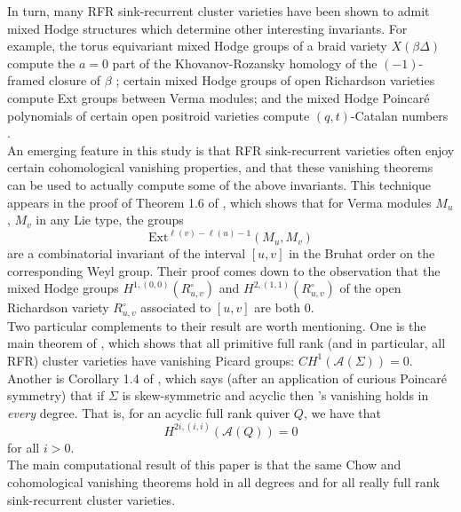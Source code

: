 \documentclass[11pt]{amsart}
\theoremstyle{definition}
\theoremstyle{remark}
\numberwithin{equation}{section}
\begin{document}
In turn, many RFR sink-recurrent cluster varieties have been shown to admit mixed Hodge structures which determine other interesting invariants. For example, the torus equivariant mixed Hodge groups of a braid variety $X(\beta \Delta)$ compute the $a = 0$ part of the Khovanov-Rozansky homology of the $(-1)$-framed closure of $\beta$ \cite{MR5110495}; certain mixed Hodge groups of open Richardson varieties compute Ext groups between Verma modules; and the mixed Hodge Poincar\'e polynomials of certain open positroid varieties compute $(q, t)$-Catalan numbers \cite{MR4809331}.\\

An emerging feature in this study is that RFR sink-recurrent varieties often enjoy certain cohomological vanishing properties, and that these vanishing theorems can be used to actually compute some of the above invariants. This technique appears in the proof of Theorem 1.6 of \cite{barkley2026combinatorial}, which shows that for Verma modules $M_u$, $M_v$ in any Lie type, the groups \begin{equation}
    \text{Ext}^{\ell(v) - \ell(u) - 1}(M_u, M_v)
\end{equation} are a combinatorial invariant of the interval $[u, v]$ in the Bruhat order on the corresponding Weyl group. Their proof comes down to the observation that the mixed Hodge groups $H^{1, (0, 0)}(R_{u,v}^\circ)$ and $H^{2, (1, 1)}(R_{u,v}^\circ)$ of the open Richardson variety $R_{u,v}^\circ$ associated to $[u, v]$ are both $0$.\\

Two particular complements to their result are worth mentioning. One is the main theorem of \cite{cao2024valuation}, which shows that all primitive full rank (and in particular, all RFR) cluster varieties have vanishing Picard groups: $CH^1(\mathcal{A}(\Sigma)) = 0$. Another is Corollary 1.4 of \cite{LSII}, which says (after an application of curious Poincar\'e symmetry) that if $\Sigma$ is skew-symmetric and acyclic then \cite{barkley2026combinatorial}'s vanishing holds in \textit{every} degree. That is, for an acyclic full rank quiver $Q$, we have that \begin{equation}
H^{2i, (i, i)}(\mathcal{A}(Q)) = 0
\end{equation}
for all $i > 0$.\\

The main computational result of this paper is that the same Chow and cohomological vanishing theorems hold in all degrees and for all really full rank sink-recurrent cluster varieties.
\end{document}
